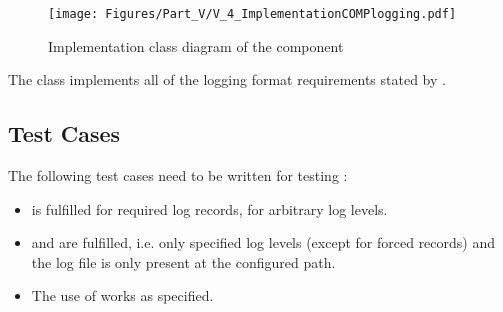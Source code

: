 \begin{figure}[H]
	\centering
	\texttt{[image: Figures/Part\_V/V\_4\_ImplementationCOMPlogging.pdf]}
	\caption{Implementation class diagram of the component \COMPlogging{}}
	\label{fig:V_4_ImplementationCOMPlogging}
\end{figure}

The \CLASSloggingFormatter{} class implements all of the logging format requirements stated by \REQUlogAnalysisInformation{}.


\subsection{Test Cases}
\label{sec:TestCasesCOMPlogging}

The following test cases need to be written for testing \COMPlogging{}:
\begin{itemize}
	\item \REQUlogForcedLogging{} is fulfilled for required log records, for arbitrary log levels.
	\item \REQUlogLevelConfig{} and \REQUlogFilePathConfig{} are fulfilled, i.e. only specified log levels (except for forced records) and the log file is only present at the configured path.
	\item The use of \CLASSrecordingHandler{} works as specified.
\end{itemize}

%
%
